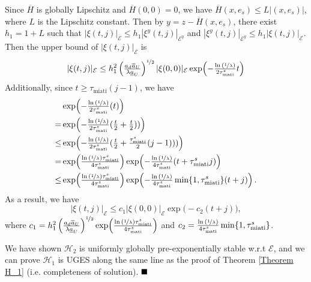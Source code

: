Since $\overline{H}$ is globally Lipschitz and $\overline{H}(0,0) = 0$, we have $\overline{H}(x,e_s) \leq L|(x,e_s)|$, where $L$ is the Lipschitz constant. 
% 
 Then by $y = z - \overline{H}(x,e_s)$, there exist $h_1 = 1 + L$ such that
 $|\xi(t,j)|_{\mathcal{E}} \leq h_1 |\xi^y(t,j)|_{\mathcal{E}^y} $ and $|\xi^y(t,j)|_{\mathcal{E}^y} \leq h_1 |\xi(t,j)|_{\mathcal{E}} $. Then the upper bound of $|\xi(t,j)|_{\mathcal{E}} $ is
 \begin{equation*}
     |\xi(t,j)|_{\mathcal{E}} \leq h_1^2 \left(\tfrac{a_d \overline{a}_U}{\lambda \underline{a}_U} \right)^{\nicefrac{1}{2}}  |\xi(0,0)|_{\mathcal{E}}  \exp \!\left(-\tfrac{\ln{(\nicefrac{1}{\lambda})}}{2 \tau_{\text{mati}}^s}t \right)
 \end{equation*}
Additionally, since $t \geq \tau_{\text{miati}} (j-1)$, we have
\begin{equation*}
    \begin{aligned}
        &\exp \!\left(-\tfrac{\ln{(\nicefrac{1}{\lambda})}}{2 \tau_{\text{mati}}^s}(t) \right) \\
        =&  \exp \!\left(-\tfrac{\ln{(\nicefrac{1}{\lambda})}}{2 \tau_{\text{mati}}^s}(\tfrac{t}{2}+\tfrac{t}{2})) \right) \\
        \leq & \exp \!\left(-\tfrac{\ln{(\nicefrac{1}{\lambda})}}{2 \tau_{\text{mati}}^s}(\tfrac{t}{2}+\tfrac{\tau_{\text{miati}}^s}{2}(j-1))) \right) \\
        =& \exp \!\left( \tfrac{\ln{(\nicefrac{1}{\lambda})}\tau_{\text{miati}}^s}{4 \tau_{\text{mati}}^s}\right)   
            \exp \!\left(-\tfrac{\ln{(\nicefrac{1}{\lambda})}}{4 \tau_{\text{mati}}^s}(t+\tau_{\text{miati}}^sj) \right) \\
        \leq & \exp \!\left( \tfrac{\ln{(\nicefrac{1}{\lambda})}\tau_{\text{miati}}^s}{4 \tau_{\text{mati}}^s}\right)   
            \exp \!\left(-\tfrac{\ln{(\nicefrac{1}{\lambda})}}{4 \tau_{\text{mati}}^s}  \min\{1,\tau_{\text{miati}}^s \} (t+j) \right).
    \end{aligned}
\end{equation*}
As a result, we have 
\begin{equation*}
    |\xi(t,j)|_{\mathcal{E}} \leq c_1 |\xi(0,0)|_{\mathcal{E}}\exp \! \big(- c_2 (t+j)\big),
\end{equation*}
where $c_1 = h_1^2 \left(\tfrac{a_d \overline{a}_U}{\lambda \underline{a}_U} \right)^{\nicefrac{1}{2}} \exp \!\left( \tfrac{\ln{(\nicefrac{1}{\lambda})}\tau_{\text{miati}}^s}{4 \tau_{\text{mati}}^s}\right)$ and $c_2 = \tfrac{\ln{(\nicefrac{1}{\lambda})}}{4 \tau_{\text{mati}}^s}  \min\{1,\tau_{\text{miati}}^s \}$.



We have shown $\mathcal{H}_2$ is uniformly globally pre-exponentially stable w.r.t $\mathcal{E}$, and we can prove $\mathcal{H}_1$ is UGES along the same line as the proof of Theorem \ref{Theorem H_1} (i.e. completeness of solution). $\hfill\blacksquare$
